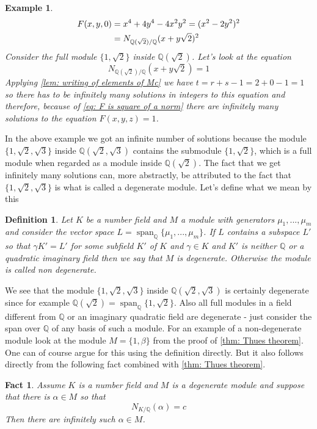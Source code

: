 \documentclass{article}
\newcommand{\Span}{\operatorname{span}}
\newtheorem{definition}{Definition}[section]
\newtheorem{example}{Example}[section]
\newtheorem{fact}{Fact}[section]
\newcommand{\mbb}[1]{\mathbb{#1}}
\begin{document}
\begin{example}
\begin{align}\label{eq: F is square of a norm}
    F(x,y,0) &= x^4 + 4y^4 - 4x^2y^2 = (x^2 - 2y^2)^2  \\
    &= N_{\mbb Q(\sqrt 2) / \mbb Q}(x + y \sqrt 2)^2 \notag
\end{align}
Consider the full module $\{1, \sqrt 2\}$ inside $\mbb Q(\sqrt 2)$. Let's look at the equation 
$$N_{\mbb Q(\sqrt 2) / \mbb Q}(x + y \sqrt 2) = 1$$
Applying \cref{lem: writing of elements of Mc} we have $t = r+s -1 =  2 + 0 - 1 = 1$ so there has to be infinitely many solutions in integers to this equation and therefore, because of \cref{eq: F is square of a norm} there are infinitely many solutions to the equation $F(x, y, z) = 1$. 
\end{example}
In the above example we got an infinite number of solutions because the module $\{1, \sqrt 2, \sqrt 3 \}$ inside $\mbb Q(\sqrt 2, \sqrt 3)$ contains the submodule $\{1, \sqrt 2\}$, which is a full module when regarded as a module inside $\mbb Q(\sqrt 2)$. The fact that we get infinitely many solutions can, more abstractly, be attributed to the fact that $\{1, \sqrt 2, \sqrt 3 \}$ is what is called a degenerate module. Let's define what we mean by this
\begin{definition}\label{def: Degenerate module}
    Let $K$ be a number field and $M$ a module with generators $\mu_1, ..., \mu_m$ and consider the vector space $L = \Span_{\mbb Q}\{\mu_1, ..., \mu_m \}$. If $L$ contains a subspace $L'$ so that $\gamma K' = L'$ for some subfield $K'$ of $K$ and $\gamma \in K$ and $K'$ is neither $\mbb Q$ or a quadratic imaginary field then we say that $M$ is degenerate. Otherwise the module is called non degenerate.
\end{definition}
We see that the module $\{1, \sqrt 2, \sqrt 3 \}$ inside $\mbb Q(\sqrt 2, \sqrt 3)$ is certainly degenerate since for example $\mbb Q(\sqrt 2) = \Span_{\mbb Q} \{1, \sqrt 2 \}$. Also all full modules in a field different from $\mbb Q$ or an imaginary quadratic field are degenerate - just consider the span over $\mbb Q$ of any basis of such a module. For an example of a non-degenerate module look at the module $M = \{1, \beta \}$ from the proof of \cref{thm: Thues theorem}. One can of course argue for this using the definition directly. But it also follows directly from the following fact combined with \cref{thm: Thues theorem}.
\begin{fact}
    Assume $K$ is a number field and $M$ is a degenerate module and suppose that there is $\alpha \in M$ so that 
    $$N_{K / \mbb Q}(\alpha) = c$$
    Then there are infinitely such $\alpha \in M$.
\end{fact}
\end{document}
